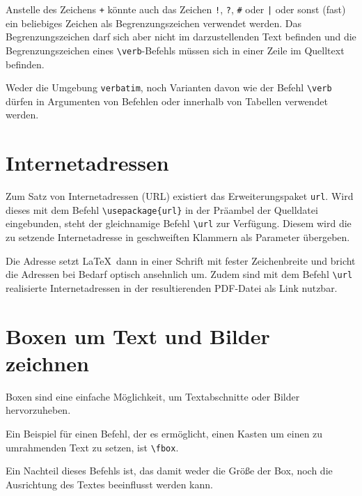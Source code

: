 \documentclass[a4paper,10pt,twoside]{scrbook}
\begin{document}

Anstelle des Zeichens \verb|+| könnte auch das Zeichen \verb?!?, \verb#?#, \verb<#< oder \verb!|! oder sonst (fast) ein beliebiges Zeichen als Begrenzungszeichen
verwendet werden. Das Begrenzungszeichen darf sich
aber nicht im darzustellenden Text befinden und die 
Begrenzungszeichen eines \verb!\verb!-Befehls müssen sich 
in einer Zeile im Quelltext befinden. 

Weder die Umgebung \verb!verbatim!, noch Varianten davon wie der Befehl \verb!\verb! dürfen in Argumenten von Befehlen oder innerhalb von Tabellen verwendet werden.



\section{Internetadressen}

Zum Satz von Internetadressen (URL) existiert das Erweiterungspaket \verb!url!. Wird dieses mit dem Befehl \verb!\usepackage{url}! in der Präambel der Quelldatei eingebunden, steht der gleichnamige Befehl \verb!\url! zur Verfügung. Diesem wird die zu setzende
Internetadresse in geschweiften Klammern als Parameter übergeben. 


Die Adresse setzt \LaTeX\ dann in einer Schrift mit fester Zeichenbreite und bricht die Adressen bei Bedarf optisch ansehnlich um.
Zudem sind mit dem Befehl \verb!\url! realisierte Internetadressen in der resultierenden PDF-Datei als Link nutzbar.


\section{Boxen um Text und Bilder zeichnen}
\label{Abschnitt_Boxen}



Boxen sind eine einfache Möglichkeit, um Textabschnitte oder Bilder hervorzuheben. 

Ein Beispiel für einen Befehl, der es ermöglicht, einen Kasten um einen zu umrahmenden Text zu setzen, ist \verb!\fbox!.


Ein Nachteil dieses Befehls ist, das damit weder die Größe der Box, noch die Ausrichtung des Textes beeinflusst werden kann.
\end{document}
